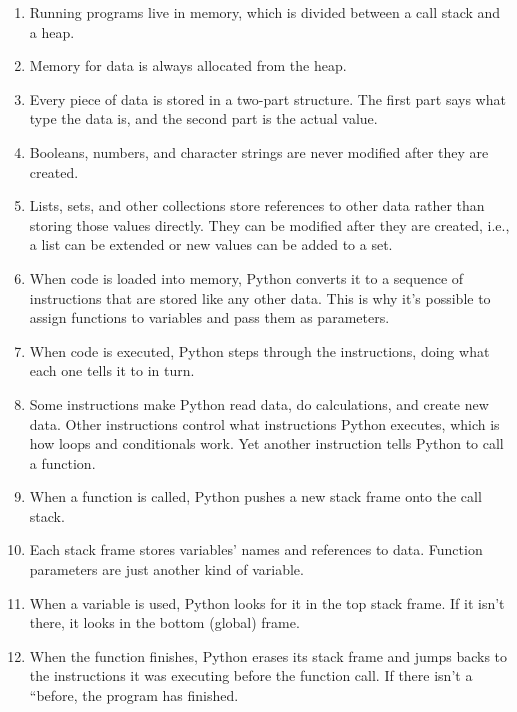 \begin{enumerate}

\item
  Running programs live in memory,
  which is divided between a call stack and a heap.

\item
  Memory for data is always allocated from the heap.

\item
  Every piece of data is stored in a two-part structure.
  The first part says what type the data is,
  and the second part is the actual value.

\item
  Booleans, numbers, and character strings are never modified after they are created.

\item
  Lists, sets, and other collections store references to other data
  rather than storing those values directly.
  They can be modified after they are created,
  i.e.,
  a list can be extended or new values can be added to a set.

\item
  When code is loaded into memory,
  Python converts it to a sequence of instructions
  that are stored like any other data.
  This is why it's possible to assign functions to variables
  and pass them as parameters.

\item
  When code is executed,
  Python steps through the instructions,
  doing what each one tells it to in turn.

\item
  Some instructions make Python read data,
  do calculations,
  and create new data.
  Other instructions control what instructions Python executes,
  which is how loops and conditionals work.
  Yet another instruction tells Python to call a function.

\item
  When a function is called,
  Python pushes a new stack frame onto the call stack.

\item
  Each stack frame stores variables' names and references to data.
  Function parameters are just another kind of variable.

\item
  When a variable is used,
  Python looks for it in the top stack frame.
  If it isn't there, it looks in the bottom (global) frame.

\item
  When the function finishes,
  Python erases its stack frame and jumps backs to
  the instructions it was executing before the function call.
  If there isn't a ``before,
  the program has finished.

\end{enumerate}

